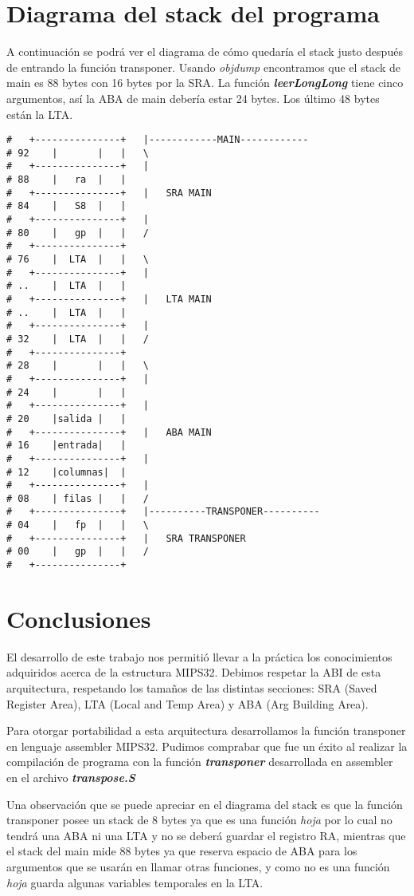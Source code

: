 \documentclass[a4paper]{article}
\begin{document}
\section{Diagrama del stack del programa}
A continuación se podrá ver el diagrama de cómo quedaría el stack justo después de entrando la función transponer. Usando \textit{objdump} encontramos que el stack de main es 88 bytes con 16 bytes por la SRA. La función \textbf{\textit{leerLongLong}} tiene cinco argumentos, así la ABA de main debería estar 24 bytes. Los último 48 bytes están la LTA.
\begin{verbatim}
#   +---------------+   |------------MAIN------------
# 92    |       |   |   \
#   +---------------+   |
# 88    |   ra  |   |
#   +---------------+   |   SRA MAIN
# 84    |   S8  |   |
#   +---------------+   |
# 80    |   gp  |   |   /
#   +---------------+
# 76    |  LTA  |   |   \
#   +---------------+   |
# ..    |  LTA  |   |
#   +---------------+   |   LTA MAIN
# ..    |  LTA  |   |
#   +---------------+   |
# 32    |  LTA  |   |   /
#   +---------------+
# 28    |       |   |   \
#   +---------------+   |
# 24    |       |   |
#   +---------------+   |
# 20    |salida |   |
#   +---------------+   |   ABA MAIN
# 16    |entrada|   |
#   +---------------+   |
# 12    |columnas|  |
#   +---------------+   |
# 08    | filas |   |   /
#   +---------------+   |----------TRANSPONER----------
# 04    |   fp  |   |   \
#   +---------------+   |   SRA TRANSPONER
# 00    |   gp  |   |   /
#   +---------------+
\end{verbatim}


\section{Conclusiones}
	El desarrollo de este trabajo nos permitió llevar a la práctica los conocimientos adquiridos acerca de la estructura MIPS32.  Debimos respetar la ABI de esta arquitectura, respetando los tamaños de las distintas secciones: SRA (Saved Register Area), LTA (Local and Temp Area) y ABA (Arg Building Area).

    Para otorgar portabilidad a esta arquitectura desarrollamos la función transponer en lenguaje assembler MIPS32. Pudimos comprabar que fue un éxito al realizar la compilación de programa con la función \textbf{\textit{transponer}} desarrollada en assembler en el archivo \textbf{\textit{transpose.S}}

    Una observación que se puede apreciar en el diagrama del stack es que la función transponer posee un stack de 8 bytes ya que es una función \textit{hoja} por lo cual no tendrá una ABA ni una LTA y no se deberá guardar el registro RA, mientras que el stack del main mide 88 bytes ya que reserva espacio de ABA para los argumentos que se usarán en llamar otras funciones, y como no es una función \textit{hoja} guarda algunas variables temporales en la LTA.
\end{document}
